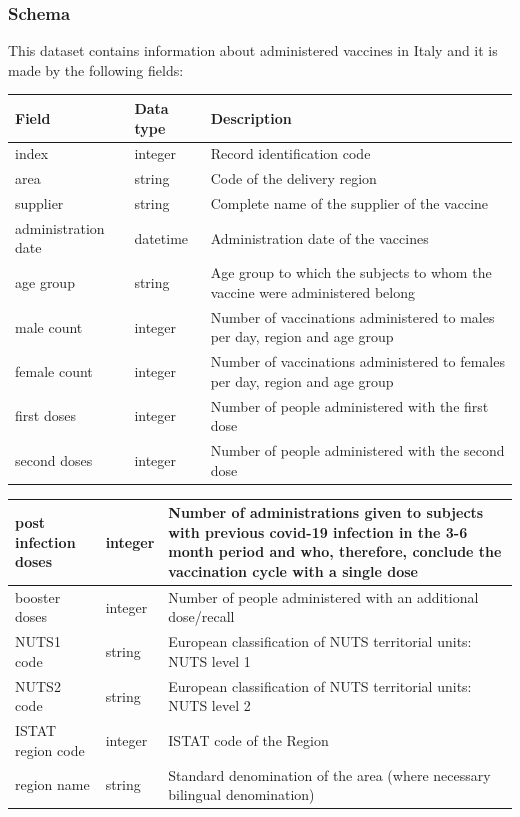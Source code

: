 \documentclass{article}
\begin{document}
\subsubsection{Schema}
\label{subsec:vaccination schema}
This dataset contains information about administered vaccines in Italy and it is made by the following fields:
\hfill\break
\begin{center}
\begin{tabular}{ |m{4cm}|m{2cm}|m{4.5cm}|}
  \hline
  \bfseries{Field} & \bfseries{Data type} & \bfseries{Description} \\
  \hline\hline
  index & integer & Record identification code\\
  \hline
  area & string & Code of the delivery region\\
    \hline
      supplier & string & Complete name of the supplier of the vaccine\\
    \hline
          administration date & datetime & Administration date of the vaccines\\
              \hline
          age group & string & Age group to which the subjects to whom the vaccine were administered belong\\
                        \hline
          male count & integer & Number of vaccinations administered to males per day, region and age group\\
                        \hline
          female count & integer & Number of vaccinations administered to females per day, region and age group\\
    \hline
  first doses & integer & Number of people administered with the first dose\\ 
    \hline
  second doses & integer & Number of people administered with the second dose\\
    \hline

\end{tabular}
\end{center}

\newpage
\begin{center}
\begin{tabular}{ |m{4cm}|m{2cm}|m{4.5cm}|}
\hline
  post infection doses & integer & Number of administrations given to subjects with previous covid-19 infection in the 3-6 month period and who, therefore, conclude the vaccination cycle with a single dose\\ 
    \hline
  booster doses & integer & Number of people administered with an additional dose/recall\\ 
    \hline
  NUTS1 code & string & European classification of NUTS territorial units: NUTS level 1\\ 
    \hline
  NUTS2 code & string & European classification of NUTS territorial units: NUTS level 2\\ 
    \hline
  ISTAT region code & integer & ISTAT code of the Region\\
    \hline
  region name & string & Standard denomination of the area (where necessary bilingual denomination)\\ 
  \hline
  \end{tabular}
\end{center}
\hfill\break
\hfill\break
\end{document}

